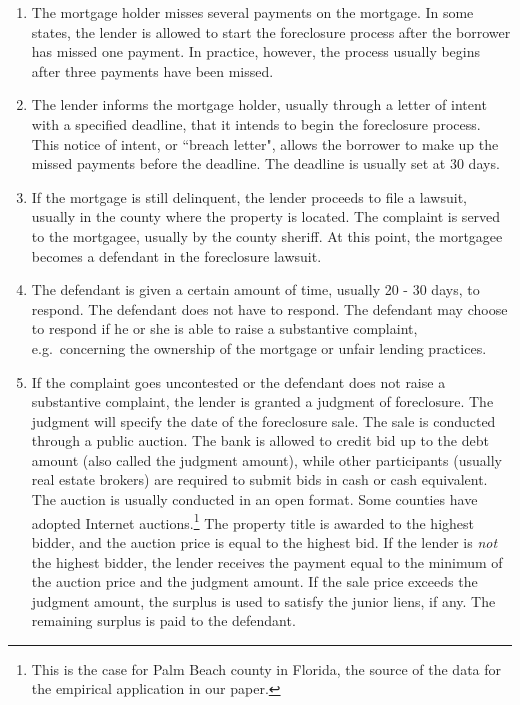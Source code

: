 \documentclass[11pt,twopage]{article}
\begin{document}
\begin{enumerate}
\item The mortgage holder misses several payments on the mortgage. In
  some states, the lender is allowed to start the foreclosure process
  after the borrower has missed one payment. In practice, however, the
  process usually begins after three payments have been missed.
\item The lender informs the mortgage holder, usually through a letter
  of intent with a specified deadline, that it intends to begin the
  foreclosure process. This notice of intent, or ``breach letter",
  allows the borrower to make up the missed payments before the
  deadline. The deadline is usually set at 30 days.
\item If the mortgage is still delinquent, the lender proceeds to file
  a lawsuit, usually in the county where the property is located. The
  complaint is served to the mortgagee, usually by the county
  sheriff. At this point, the mortgagee becomes a defendant in the
  foreclosure lawsuit.
\item The defendant is given a certain amount of time, usually 20 - 30
  days, to respond. The defendant does not have to respond. The
  defendant may choose to respond if he or she is able to raise a
  substantive complaint, e.g.\ concerning the ownership of the
  mortgage or unfair lending practices.
\item If the complaint goes uncontested or the defendant does not
  raise a substantive complaint, the lender is granted a judgment of
  foreclosure. The judgment will specify the date of the foreclosure
  sale. The sale is conducted through a public auction. The bank is
  allowed to credit bid up to the debt amount (also called the
  judgment amount), while other participants (usually real estate
  brokers) are required to submit bids in cash or cash equivalent. The
  auction is usually conducted in an open format. Some counties have
  adopted Internet auctions.\footnote{This is the case for Palm Beach
    county in Florida, the source of the data for the empirical
    application in our paper.} The property title is awarded to the
  highest bidder, and the auction price is equal to the highest
  bid. If the lender is \emph{not} the highest bidder, the lender
  receives the payment equal to the minimum of the auction price and
  the judgment amount. If the sale price exceeds the judgment amount,
  the surplus is used to satisfy the junior liens, if any. The
  remaining surplus is paid to the defendant.\label{enum:auction}
\end{enumerate}
\end{document}
